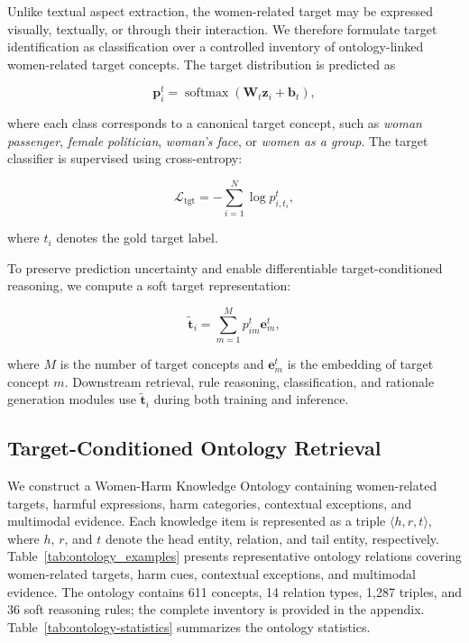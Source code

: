 \documentclass[11pt]{article}
\begin{document}
Unlike textual aspect extraction, the women-related target may be
expressed visually, textually, or through their interaction. We
therefore formulate target identification as classification over a
controlled inventory of ontology-linked women-related target concepts.
The target distribution is predicted as

\begin{equation}
\mathbf{p}^{t}_i
=
\operatorname{softmax}
\left(
\mathbf{W}_{t}\mathbf{z}_i+\mathbf{b}_{t}
\right),
\label{eq:target-distribution}
\end{equation}

where each class corresponds to a canonical target concept, such as
\textit{woman passenger}, \textit{female politician},
\textit{woman's face}, or \textit{women as a group}. The target
classifier is supervised using cross-entropy:

\begin{equation}
\mathcal{L}_{\mathrm{tgt}}
=
-\sum_{i=1}^{N}
\log p^{t}_{i,t_i},
\label{eq:target-loss}
\end{equation}

where $t_i$ denotes the gold target label.

To preserve prediction uncertainty and enable differentiable
target-conditioned reasoning, we compute a soft target representation:

\begin{equation}
\widetilde{\mathbf{t}}_i
=
\sum_{m=1}^{M}
p^{t}_{im}\mathbf{e}^{t}_{m},
\label{eq:target-representation}
\end{equation}

where $M$ is the number of target concepts and
$\mathbf{e}^{t}_{m}$ is the embedding of target concept $m$.
Downstream retrieval, rule reasoning, classification, and rationale
generation modules use $\widetilde{\mathbf{t}}_i$ during both training
and inference.
\subsection{Target-Conditioned Ontology Retrieval}
\label{subsec:knowledge-retrieval}

We construct a Women-Harm Knowledge Ontology containing
women-related targets, harmful expressions, harm categories,
contextual exceptions, and multimodal evidence. Each knowledge item
is represented as a triple $\langle h,r,t\rangle$, where $h$, $r$,
and $t$ denote the head entity, relation, and tail entity,
respectively. Table~\ref{tab:ontology_examples} presents representative ontology
relations covering women-related targets, harm cues, contextual
exceptions, and multimodal evidence. The ontology contains 611 concepts, 14 relation types, 1,287 triples,
and 36 soft reasoning rules; the complete inventory is provided in
the appendix.
Table~\ref{tab:ontology-statistics} summarizes the ontology
statistics.
\end{document}

